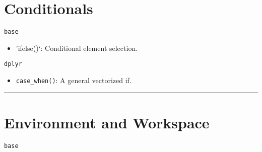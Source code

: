 \documentclass[]{book}
\providecommand{\tightlist}{%
  \setlength{\itemsep}{0pt}\setlength{\parskip}{0pt}}
\theoremstyle{definition}
\theoremstyle{definition}
\theoremstyle{definition}
\theoremstyle{remark}
\begin{document}
\section{Conditionals}\label{conditionals}

\texttt{base}

\begin{itemize}
\tightlist
\item
  'ifelse()`: Conditional element selection.
\end{itemize}

\texttt{dplyr}

\begin{itemize}
\tightlist
\item
  \texttt{case\_when()}: A general vectorized if.
\end{itemize}

\begin{center}\rule{0.5\linewidth}{\linethickness}\end{center}

\section{Environment and Workspace}\label{environment-and-workspace}

\texttt{base}
\end{document}
